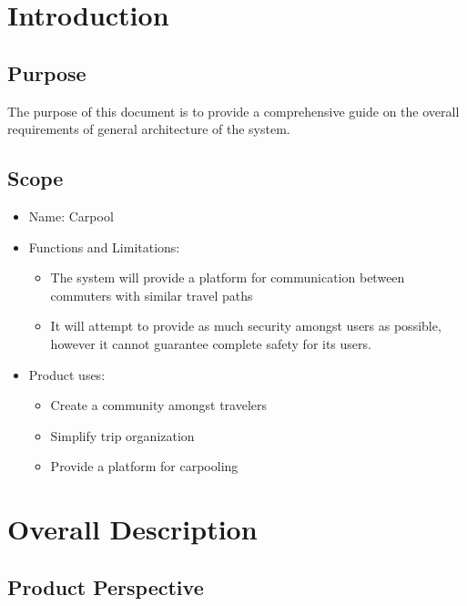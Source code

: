 \documentclass[a4paper]{article}
\begin{document}


\tableofcontents
\newpage

\section{Introduction}
  \subsection{Purpose}
  The purpose of this document is to provide a comprehensive guide on the overall requirements of general architecture of the system.
  \subsection{Scope}
  \begin{itemize}
    \item Name: Carpool
    \item Functions and Limitations: 
    \begin{itemize}
    	\item The system will provide a platform for communication between commuters with similar travel paths
        \item It will attempt to provide as much security amongst users as possible, however it cannot guarantee complete safety for its users.
     \end{itemize}
     
     \item Product uses:
       \begin{itemize}
       \item Create a community amongst travelers
       \item Simplify trip organization
       \item Provide a platform for carpooling
       \end{itemize}
     
  \end{itemize}

\section{Overall Description}

\subsection{Product Perspective}
\end{document}
